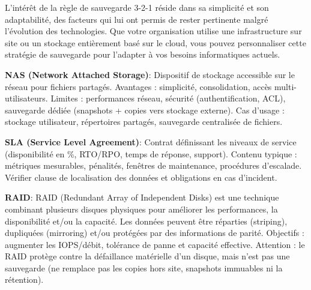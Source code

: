 \noindent L'intérêt de la règle de sauvegarde 3-2-1 réside dans sa simplicité et son adaptabilité, des facteurs qui lui ont permis de rester pertinente malgré l'évolution des technologies. Que votre organisation utilise une infrastructure sur site ou un stockage entièrement basé sur le cloud, vous pouvez personnaliser cette stratégie de sauvegarde pour l'adapter à vos besoins informatiques actuels.

\vspace{0.5cm}

\noindent \textbf{NAS (Network Attached Storage)}:
Dispositif de stockage accessible sur le réseau pour fichiers partagés. Avantages : simplicité, consolidation, accès multi-utilisateurs. Limites : performances réseau, sécurité (authentification, ACL), sauvegarde dédiée (snapshots + copies vers stockage externe). Cas d'usage : stockage utilisateur, répertoires partagés, sauvegarde centralisée de fichiers.

\vspace{0.5cm}

\noindent \textbf{SLA (Service Level Agreement)}:
Contrat définissant les niveaux de service (disponibilité en \%, RTO/RPO, temps de réponse, support). Contenu typique : métriques mesurables, pénalités, fenêtres de maintenance, procédures d'escalade. Vérifier clause de localisation des données et obligations en cas d'incident.

\vspace{0.5cm}

\noindent \textbf{RAID}:
RAID (Redundant Array of Independent Disks) est une technique combinant plusieurs disques physiques pour améliorer les performances, la disponibilité et/ou la capacité. Les données peuvent être réparties (striping), dupliquées (mirroring) et/ou protégées par des informations de parité. Objectifs : augmenter les IOPS/débit, tolérance de panne et capacité effective. Attention : le RAID protège contre la défaillance matérielle d'un disque, mais n'est pas une sauvegarde (ne remplace pas les copies hors site, snapshots immuables ni la rétention).


